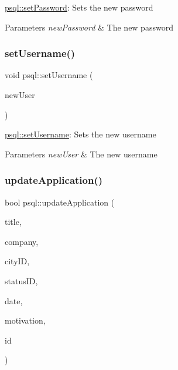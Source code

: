\hyperlink{classpsql_a6c29350037550b7e5a5bb8f439c405f3}{psql\+::set\+Password}\+: Sets the new password 


\begin{DoxyParams}{Parameters}
{\em new\+Password} & The new password \\
\hline
\end{DoxyParams}
\mbox{\label{classpsql_a1488a9e4909abd172651b7be240342cb}} 
\subsubsection{\texorpdfstring{set\+Username()}{setUsername()}}
{\footnotesize\ttfamily void psql\+::set\+Username (\begin{DoxyParamCaption}\item[{Q\+String}]{new\+User }\end{DoxyParamCaption})}



\hyperlink{classpsql_a1488a9e4909abd172651b7be240342cb}{psql\+::set\+Username}\+: Sets the new username 


\begin{DoxyParams}{Parameters}
{\em new\+User} & The new username \\
\hline
\end{DoxyParams}
\mbox{\label{classpsql_a836eea3c6deb2d6a3a357193a99d6ee7}} 
\subsubsection{\texorpdfstring{update\+Application()}{updateApplication()}}
{\footnotesize\ttfamily bool psql\+::update\+Application (\begin{DoxyParamCaption}\item[{Q\+String}]{title,  }\item[{Q\+String}]{company,  }\item[{int}]{city\+ID,  }\item[{int}]{status\+ID,  }\item[{Q\+String}]{date,  }\item[{Q\+String}]{motivation,  }\item[{int}]{id }\end{DoxyParamCaption})}



